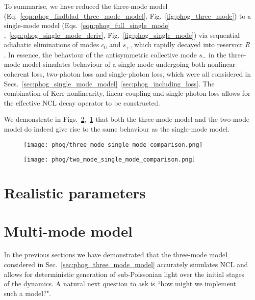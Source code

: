 To summarise, we have reduced the three-mode model (Eq.~\ref{eqn:phog_lindblad_three_mode_model}, Fig.~\ref{fig:phog_three_mode}) to a single-mode model (Eqs.~\ref{eqn:phog_full_single_mode}
,~\ref{eqn:phog_single_mode_deriv}, Fig.~\ref{fig:phog_single_mode}) via sequential adiabatic eliminations of modes $c_0$ and $s_+$, which rapidly decayed into reservoir $R$. In essence, the behaviour of the antisymmetric collective mode $s_-$ in the three-mode model simulates behaviour of a single mode undergoing both nonlinear coherent loss, two-photon loss and single-photon loss, which were all considered in Secs.~\ref{sec:phog_single_mode_model}~\ref{sec:phog_including_loss}. The combination of Kerr nonlinearity, linear coupling and single-photon loss allows for the effective NCL decay operator to be constructed.

We demonstrate in Figs.~\ref{fig:phog_two_mode_single_mode_comparison},~\ref{fig:phog_three_mode_single_mode_comparison} that both the three-mode model and the two-mode model do indeed give rise to the same behaviour as the single-mode model. 

\begin{figure}[htp]
\centering
\texttt{[image: phog/three\_mode\_single\_mode\_comparison.png]}
\caption{\label{fig:phog_three_mode_single_mode_comparison} }
\end{figure}

\begin{figure}[htp]
\centering
\texttt{[image: phog/two\_mode\_single\_mode\_comparison.png]}
\caption{\label{fig:phog_two_mode_single_mode_comparison} }
\end{figure}

\section{Realistic parameters}\label{sec:parameters}

\clearpage
\section{Multi-mode model}\label{sec:phog_multi_mode}
In the previous sections we have demonstrated that the three-mode model considered in Sec.~\ref{sec:phog_three_mode_model} accurately simulates NCL and allows for deterministic generation of sub-Poissonian light over the initial stages of the dynamics. A natural next question to ask is ``how might we implement such a model?". 

